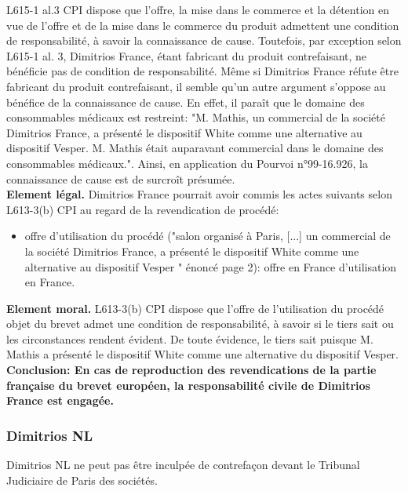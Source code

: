 L615-1 al.3 CPI dispose que l'offre, la mise dans le commerce et la détention en vue
de l'offre et de la mise dans le commerce du produit admettent une condition de
responsabilité, à savoir la connaissance de cause. Toutefois, par exception
selon L615-1 al. 3, Dimitrios France, étant fabricant
du produit contrefaisant, ne bénéficie pas de condition de responsabilité. Même si
Dimitrios France réfute être fabricant du produit contrefaisant, il semble qu'un
autre argument s'oppose au bénéfice de la connaissance de cause. En effet, il paraît
que le domaine des consommables médicaux est restreint: "M. Mathis, un commercial
de la société Dimitrios France, a présenté le dispositif White comme une alternative
au dispositif Vesper. M. Mathis était auparavant commercial dans le domaine des
consommables médicaux.". Ainsi, en application du Pourvoi n°99-16.926, la
connaissance de cause est de surcroît présumée.\\

\textbf{Element légal.} Dimitrios France pourrait avoir commis les actes suivants selon L613-3(b) CPI
au regard de la revendication de procédé:
\begin{itemize}
    \item offre d'utilisation du procédé ("salon
    organisé à Paris, [...] un commercial de la société Dimitrios France, a 
    présenté le dispositif White comme une alternative au dispositif Vesper
    " énoncé page 2): offre en France d'utilisation en France.\\
\end{itemize}

\textbf{Element moral.} L613-3(b) CPI dispose que l'offre de l'utilisation du procédé objet du brevet admet
une condition de responsabilité, à savoir si le tiers sait ou les circonstances
rendent évident. De toute évidence, le tiers sait puisque M. Mathis a présenté
le dispositif White comme une alternative du dispositif Vesper.\\

\textbf{Conclusion: En cas de reproduction des revendications de la partie française du brevet européen,
la responsabilité civile de Dimitrios France est engagée.}

\subsubsection{Dimitrios NL}

Dimitrios NL ne peut pas être inculpée de contrefaçon devant le Tribunal Judiciaire
de Paris des sociétés.\\

